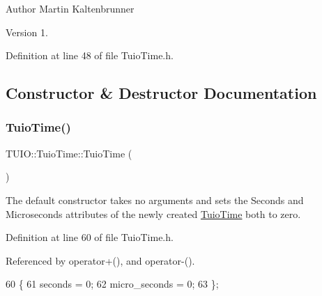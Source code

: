 \begin{DoxyAuthor}{Author}
Martin Kaltenbrunner 
\end{DoxyAuthor}
\begin{DoxyVersion}{Version}
1. 
\end{DoxyVersion}


Definition at line 48 of file Tuio\+Time.\+h.



\subsection{Constructor \& Destructor Documentation}
\mbox{\label{class_t_u_i_o_1_1_tuio_time_a924521ecf43b6484fad9550661eedb0a}} 
\subsubsection{\texorpdfstring{Tuio\+Time()}{TuioTime()}\hspace{0.1cm}{\footnotesize\ttfamily [1/3]}}
{\footnotesize\ttfamily T\+U\+I\+O\+::\+Tuio\+Time\+::\+Tuio\+Time (\begin{DoxyParamCaption}{ }\end{DoxyParamCaption})\hspace{0.3cm}{\ttfamily [inline]}}

The default constructor takes no arguments and sets the Seconds and Microseconds attributes of the newly created \hyperlink{class_t_u_i_o_1_1_tuio_time}{Tuio\+Time} both to zero. 

Definition at line 60 of file Tuio\+Time.\+h.



Referenced by operator+(), and operator-\/().


\begin{DoxyCode}
60                     \{
61             seconds = 0;
62             micro\_seconds = 0;
63         \};
\end{DoxyCode}
\mbox{\label{class_t_u_i_o_1_1_tuio_time_a3128aa283fb3df08ac1f5915f892e101}} 
